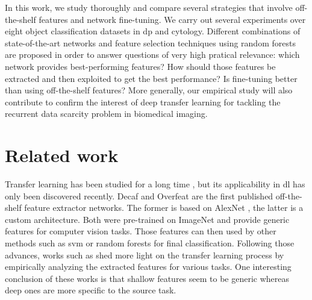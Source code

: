 In this work, we study thoroughly and compare several strategies that involve off-the-shelf features and network fine-tuning. We carry out several experiments over eight object classification datasets in \acrshort{dp} and cytology. Different combinations of state-of-the-art networks and feature selection techniques using random forests are proposed in order to answer questions of very high pratical relevance: which network provides best-performing features? How should those features be extracted and then exploited to get the best performance? Is fine-tuning better than using off-the-shelf features? More generally, our empirical study will also contribute to confirm the interest of deep transfer learning for tackling the recurrent data scarcity problem in biomedical imaging.

\section{Related work}

Transfer learning has been studied for a long time \parencite{pan2010survey}, but its applicability in \acrshort{dl} has only been discovered recently. Decaf \parencite{donahue2014decaf} and Overfeat \parencite{razavian2014cnn,sermanet2013overfeat} are the first published off-the-shelf feature extractor networks. The former is based on AlexNet \parencite{krizhevsky2012imagenet}, the latter is a custom architecture. Both were pre-trained on ImageNet and provide generic features for computer vision tasks. Those features can then used by other methods such as \acrshort{svm} \parencite{fan2008liblinear} or random forests \parencite{breiman2001random} for final classification. Following those advances, works such as \parencite{yosinski2014transferable,zeiler2014visualizing} shed more light on the transfer learning process by empirically analyzing the extracted features for various tasks. One interesting conclusion of these works is that shallow features seem to be generic whereas deep ones are more specific to the source task.

